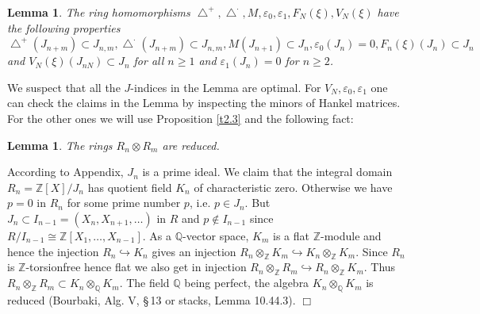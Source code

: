\documentclass[12pt,leqno]{article}
\newcommand{\Q}{{\mathbb{Q}}}
\newcommand{\Z}{{\mathbb{Z}}}
\newcommand{\btu}{\bigtriangleup}
\newtheorem{lemma}[theorem]{Lemma}
\newenvironment{rem}{\noindent {\bf Remark}}{}
\newenvironment{proof}{\noindent {\bf Proof}}{\mbox{}\hspace*{\fill}$\Box$}
\begin{document}
\begin{lemma}
\label{t2.6}
The ring homomorphisms $\btu^+ , \btu^{\cdot} , M , \varepsilon_0 , \varepsilon_1 , F_N (\xi) , V_N (\xi)$ have the following properties $\btu^+ (J_{n+m}) \subset J_{n,m} , \btu^{\cdot} (J_{n+m}) \subset J_{n,m} , M (J_{n+1}) \subset J_n , \varepsilon_0 (J_n) = 0 , F_n (\xi) (J_n) \subset J_n$ and $V_N (\xi) (J_{nN}) \subset J_n$ for all $n \ge 1$ and $\varepsilon_1 (J_n) = 0$ for $n \ge 2$.
\end{lemma}

\begin{rem}
We suspect that all the $J$-indices in the Lemma are optimal. For $V_N , \varepsilon_0 , \varepsilon_1$ one can check the claims in the Lemma by inspecting the minors of Hankel matrices. For the other ones we will use Proposition \ref{t2.3} and the following fact:
\end{rem}

\begin{lemma}
\label{t2.7}
The rings $R_n \otimes R_m$ are reduced.
\end{lemma}

\begin{proof}
According to \cite{H} Appendix, $J_n$ is a prime ideal. We claim that the integral domain $R_n = \Z [X] / J_n$ has quotient field $K_n$ of characteristic zero. Otherwise we have $p = 0$ in $R_n$ for some prime number $p$, i.e. $p \in J_n$. But $J_n \subset I_{n-1} = (X_n , X_{n+1} , \ldots )$ in $R$ and $p \notin I_{n-1}$ since $R / I_{n-1} \cong \Z [X_1 , \ldots , X_{n-1}]$. As a $\Q$-vector space, $K_m$ is a flat $\Z$-module and hence the injection $R_n \hookrightarrow K_n$ gives an injection $R_n \otimes_{\Z} K_m \hookrightarrow K_n \otimes_{\Z} K_m$. Since $R_n$ is $\Z$-torsionfree hence flat we also get in injection $R_n \otimes_{\Z} R_m \hookrightarrow R_n \otimes_{\Z} K_m$. Thus $R_n \otimes_{\Z} R_m \subset K_n \otimes_{\Q} K_m$. The field $\Q$ being perfect, the algebra $K_n \otimes_{\Q} K_m$ is reduced (Bourbaki, Alg. V, \S\,13 or stacks, Lemma 10.44.3).
\end{proof}
\end{document}
